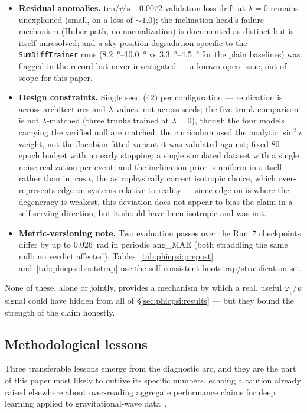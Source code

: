 \begin{itemize}
\item \textbf{Residual anomalies.} tcn/$\psi$'s $+0.0072$ validation-loss drift at $\lambda = 0$ remains unexplained (small, on a loss of ${\sim}1.0$); the inclination head's failure mechanism (Huber path, no normalization) is documented as distinct but is itself unresolved; and a sky-position degradation specific to the \texttt{SumDiffTrainer} runs (\SIrange{8.2}{10.0}{\degree} vs \SIrange{3.3}{4.5}{\degree} for the plain baselines) was flagged in the record but never investigated --- a known open issue, out of scope for this paper.
\item \textbf{Design constraints.}
Single seed (42) per configuration --- replication is across architectures and $\lambda$ values, not across seeds; the five-trunk comparison is not $\lambda$-matched (three trunks trained at $\lambda = 0$), though the four models carrying the verified null are matched; the curriculum used the analytic $\sin^2\iota$ weight, not the Jacobian-fitted variant it was validated against; fixed 80-epoch budget with no early stopping; a single simulated dataset with a single noise realization per event; and the inclination prior is uniform in $\iota$ itself rather than in $\cos\iota$, the astrophysically correct isotropic choice, which over-represents edge-on systems relative to reality --- since edge-on is where the degeneracy is weakest, this deviation does not appear to bias the claim in a self-serving direction, but it should have been isotropic and was not.
\item \textbf{Metric-versioning note.}
Two evaluation passes over the Run~7 checkpoints differ by up to \SI{0.026}{\radian} in periodic ang\_MAE (both straddling the same null; no verdict affected).
Tables~\ref{tab:phicpsi:prepost} and~\ref{tab:phicpsi:bootstrap} use the self-consistent bootstrap/stratification set.
\end{itemize}
None of these, alone or jointly, provides a mechanism by which a real, useful $\varphi_c/\psi$ signal could have hidden from all of \S\ref{sec:phicpsi:results} --- but they bound the strength of the claim honestly.

\subsection{Methodological lessons}\label{subsec:methodological-lessons}

Three transferable lessons emerge from the diagnostic arc, and they are the part of this paper most likely to outlive its specific numbers, echoing a caution already raised elsewhere about over-reading aggregate performance claims for deep learning applied to gravitational-wave data~\citep{gebhard2019magicbullet}.

